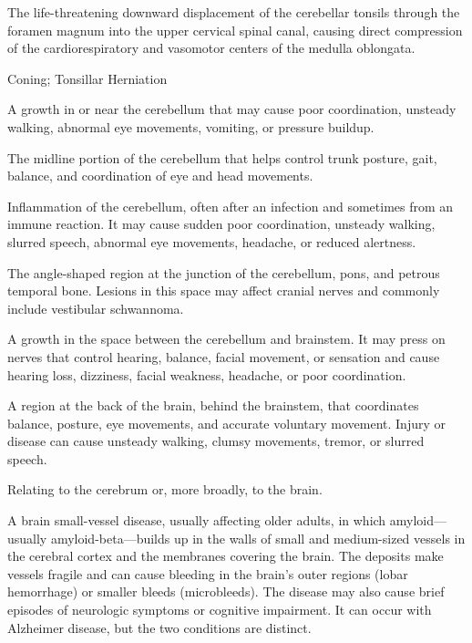  The life-threatening downward displacement of the cerebellar tonsils through the foramen magnum into the upper cervical spinal canal, causing direct compression of the cardiorespiratory and vasomotor centers of the medulla oblongata.

\synonyms
Coning; Tonsillar Herniation

 A growth in or near the cerebellum that may cause poor coordination, unsteady walking, abnormal eye movements, vomiting, or pressure buildup.

 The midline portion of the cerebellum that helps control trunk posture, gait, balance, and coordination of eye and head movements.

 Inflammation of the cerebellum, often after an infection and sometimes from an immune reaction. It may cause sudden poor coordination, unsteady walking, slurred speech, abnormal eye movements, headache, or reduced alertness.

 The angle-shaped region at the junction of the cerebellum, pons, and petrous temporal
bone. Lesions in this space may affect cranial nerves and commonly include vestibular
schwannoma.

 A growth in the space between the cerebellum and brainstem. It may press on nerves that control hearing, balance, facial movement, or sensation and cause hearing loss, dizziness, facial weakness, headache, or poor coordination.

 A region at the back of the brain, behind the brainstem, that coordinates balance, posture, eye movements, and accurate voluntary movement. Injury or disease can cause unsteady walking, clumsy movements, tremor, or slurred speech.

 Relating to the cerebrum or, more broadly, to the brain.

 A brain small-vessel disease, usually affecting older adults, in which amyloid—usually amyloid-beta—builds up in the walls of small and medium-sized vessels in the cerebral cortex and the membranes covering the brain. The deposits make vessels fragile and can cause bleeding in the brain’s outer regions (lobar hemorrhage) or smaller bleeds (microbleeds). The disease may also cause brief episodes of neurologic symptoms or cognitive impairment. It can occur with Alzheimer disease, but the two conditions are distinct.

